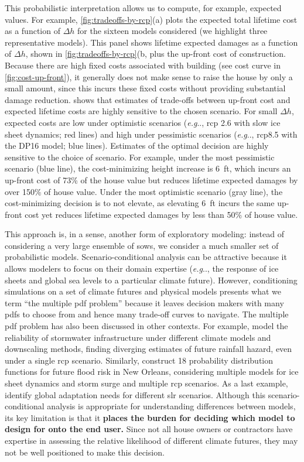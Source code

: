 \documentclass{agujournal2019}
\makeatletter
\DeclareRobustCommand\onedot{\futurelet\@let@token\@onedot}
\def\@onedot{\ifx\@let@token.\else.\null\fi\xspace}
\def\eg{\emph{e.g}\onedot} \def\Eg{\emph{E.g}\onedot}
\makeatother
\begin{document}
This probabilistic interpretation allows us to compute, for example, expected values.
For example, \cref{fig:tradeoffs-by-rcp}(a) plots the expected total lifetime cost as a function of $\Delta h$ for the sixteen models considered (we highlight three representative models).
This panel shows lifetime expected damages as a function of $\Delta h$, shown in \cref{fig:tradeoffs-by-rcp}(b,  plus the up-front cost of construction.
Because there are high fixed costs associated with building (see cost curve in \cref{fig:cost-up-front}), it generally does not make sense to raise the house by only a small amount, since this incurs these fixed costs without providing substantial damage reduction.
 shows that estimates of trade-offs between up-front cost and expected lifetime costs are highly sensitive to the chosen scenario.
For small $\Delta h$, expected costs are low under optimistic scenarios (\eg, \gls{rcp} 2.6 with slow ice sheet dynamics; red lines) and high under pessimistic scenarios (\eg, \gls{rcp}8.5 with the DP16 model; blue lines).
Estimates of the optimal decision are highly sensitive to the choice of scenario.
For example, under the most pessimistic scenario (blue line), the cost-minimizing height increase is \SI{6}{ft}, which incurs an up-front cost of 73\% of the house value but reduces lifetime expected damages by over 150\% of house value.
Under the most optimistic scenario (gray line), the cost-minimizing decision is to not elevate, as elevating \SI{6}{ft} incurs the same up-front cost yet reduces lifetime expected damages by less than 50\% of house value.

This approach is, in a sense, another form of exploratory modeling: instead of considering a very large ensemble of \glspl{sow}, we consider a much smaller set of probabilistic models.
Scenario-conditional analysis can be attractive because it allows modelers to focus on their domain expertise (\eg, the response of ice sheets and global sea levels to a particular climate future).
However, conditioning simulations on a set of climate futures and physical models presents what we term ``the multiple \gls{pdf} problem'' because it leaves decision makers with many \glspl{pdf} to choose from and hence many trade-off curves to navigate.
The multiple \gls{pdf} problem has also been discussed in other contexts.
For example,  model the reliability of stormwater infrastructure under different climate models and downscaling methods, finding diverging estimates of future rainfall hazard, even under a single \gls{rcp} scenario.
Similarly,  construct 18 probability distribution functions for future flood risk in New Orleans, considering multiple models for ice sheet dynamics and storm surge and multiple \gls{rcp} scenarios. As a last example,  identify global adaptation needs for different \gls{slr} scenarios.
Although this scenario-conditional analysis is appropriate for understanding differences between models, its key limitation is that it \textbf{places the burden for deciding which model to design for onto the end user.}
Since not all house owners or contractors have expertise in assessing the relative likelihood of different climate futures, they may not be well positioned to make this decision.
\end{document}
